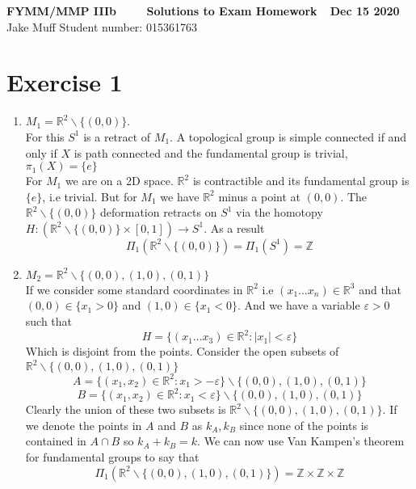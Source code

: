 \documentclass[12pt]{article}
\begin{document}
\normalsize

\baselineskip 14pt

\begin{center}
{\Large {\bf FYMM/MMP IIIb \ \ \ \  Solutions to Exam Homework\ \  Dec 15 2020}} \\
Jake Muff
Student number: 015361763
\end{center}

\bigskip

\enlargethispage*{2cm}

\section*{Exercise 1}
\begin{enumerate}
  \item $M_1 = \mathbb{R}^2 \backslash \{ (0,0) \} $. \\
  For this $S^1$ is a retract of $M_1$. A topological group is simple connected if and only if $X$ is path connected and the fundamental group is trivial, $\pi_1 (X) = \{ e \}$ \\
  For $M_1$ we are on a 2D space. $\mathbb{R}^2$ is contractible and its fundamental group is $\{ e \}$, i.e trivial. But for $M_1$ we have $\mathbb{R}^2$ minus a point at $(0,0)$. The $\mathbb{R}^2 \backslash \{ (0,0) \} $ deformation retracts on $S^1$ via the homotopy $H: (\mathbb{R}^2 \backslash \{ (0,0) \} \times [0,1] ) \rightarrow S^1$. As a result 
  $$ \Pi_1 (\mathbb{R}^2 \backslash \{ (0,0) \}) = \Pi_1 (S^1) = \mathbb{Z} $$
  
  \item $M_2 = \mathbb{R}^2 \backslash \{ (0,0), (1,0), (0,1) \} $ \\
  If we consider some standard coordinates in $\mathbb{R}^2$ i.e $(x_1 \ldots x_n) \in \mathbb{R}^3 $ and that $(0,0) \in \{ x_1 > 0 \}$ and $ (1,0) \in \{ x_1 < 0 \} $. And we have a variable $\varepsilon >0$ such that 
  $$ H = \{ (x_1 \ldots x_3) \in \mathbb{R}^2 : |x_1| < \varepsilon \} $$
  Which is disjoint from the points. Consider the open subsets of $\mathbb{R}^2 \backslash \{ (0,0), (1,0), (0,1) \} $
  $$ A = \{ (x_1, x_2) \in \mathbb{R}^2 : x_1 > - \varepsilon \} \backslash \{ (0,0), (1,0), (0,1) \} $$
  $$ B = \{ (x_1, x_2) \in \mathbb{R}^2 : x_1 < \varepsilon \} \backslash \{ (0,0), (1,0), (0,1) \} $$
  Clearly the union of these two subsets is $\mathbb{R}^2 \backslash \{ (0,0), (1,0), (0,1) \}$. If we denote the points in $A$ and $B$ as $k_A, k_B$ since none of the points is contained in $A \cap B$ so $k_A + k_B = k$. We can now use Van Kampen's theorem for fundamental groups to say that 
  $$ \Pi_1 (\mathbb{R}^2 \backslash \{ (0,0), (1,0), (0,1) \} ) = \mathbb{Z} \times \mathbb{Z} \times \mathbb{Z} $$


\end{enumerate}
\end{document}
